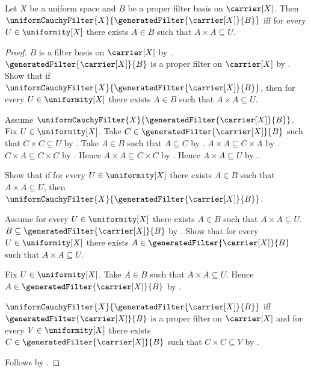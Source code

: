 \begin{theorem}\label{uniform_generated_filter_cauchy_iff}
    Let $X$ be a uniform space and $B$ be a proper filter basis on
        $\carrier[X]$.
    Then
        $\uniformCauchyFilter{X}
            {\generatedFilter{\carrier[X]}{B}}$ iff
        for every $U\in\uniformity[X]$ there exists $A\in B$ such that
            $A\times A\subseteq U$.
\end{theorem}
\begin{proof}
    $B$ is a filter basis on $\carrier[X]$ by
        .
    $\generatedFilter{\carrier[X]}{B}$ is a proper filter on $\carrier[X]$
        by .
    Show that if
        $\uniformCauchyFilter{X}
            {\generatedFilter{\carrier[X]}{B}}$, then
        for every $U\in\uniformity[X]$ there exists $A\in B$ such that
            $A\times A\subseteq U$.
    \begin{subproof}
        Assume
            $\uniformCauchyFilter{X}
                {\generatedFilter{\carrier[X]}{B}}$.
        Fix $U\in\uniformity[X]$.
        Take $C\in\generatedFilter{\carrier[X]}{B}$ such that
            $C\times C\subseteq U$ by
            .
        Take $A\in B$ such that $A\subseteq C$
            by .
        $A\times A\subseteq C\times A$ by .
        $C\times A\subseteq C\times C$ by .
        Hence $A\times A\subseteq C\times C$
            by .
        Hence $A\times A\subseteq U$ by .
    \end{subproof}

    Show that if for every $U\in\uniformity[X]$ there exists $A\in B$
        such that $A\times A\subseteq U$, then
        $\uniformCauchyFilter{X}
            {\generatedFilter{\carrier[X]}{B}}$.
    \begin{subproof}
        Assume for every $U\in\uniformity[X]$ there exists $A\in B$
            such that $A\times A\subseteq U$.
        $B\subseteq\generatedFilter{\carrier[X]}{B}$
            by .
        Show that for every $U\in\uniformity[X]$ there exists
            $A\in\generatedFilter{\carrier[X]}{B}$ such that
            $A\times A\subseteq U$.
        \begin{subproof}
            Fix $U\in\uniformity[X]$.
            Take $A\in B$ such that $A\times A\subseteq U$.
            Hence $A\in\generatedFilter{\carrier[X]}{B}$
                by .
        \end{subproof}
        $\uniformCauchyFilter{X}{
                \generatedFilter{\carrier[X]}{B}}$ iff
            $\generatedFilter{\carrier[X]}{B}$ is a proper filter on
                $\carrier[X]$ and
            for every $V\in\uniformity[X]$ there exists
                $C\in\generatedFilter{\carrier[X]}{B}$ such that
                $C\times C\subseteq V$ by
            .
    \end{subproof}
    Follows by \auto.
\end{proof}

